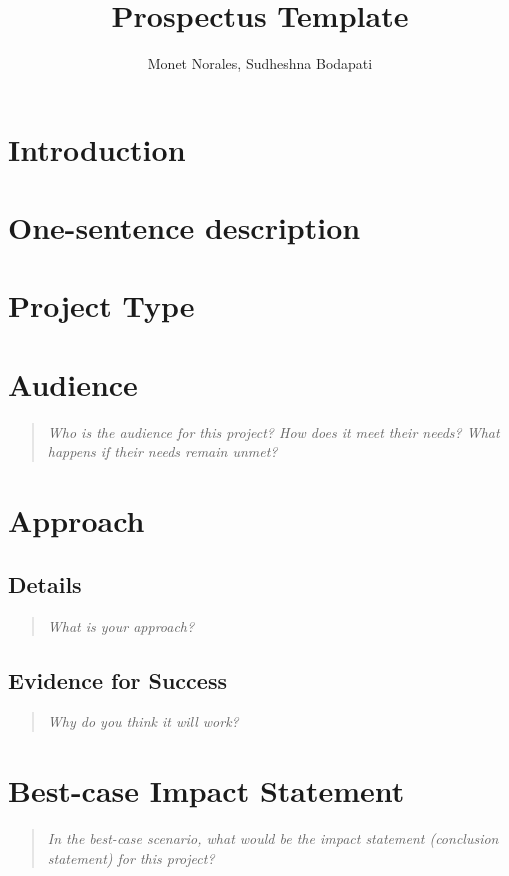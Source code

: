 \documentclass{proc}
\begin{document}
\title{Prospectus Template}

\author{Monet Norales, Sudheshna Bodapati}

\maketitle

\section{Introduction}

\section{One-sentence description}

\section{Project Type}

\section{Audience} 
\begin{quote}
\textit{Who is the audience for this project? 
How does it meet their needs? 
What happens if their needs remain unmet?}
\end{quote}

\section{Approach}
\subsection{Details}
\begin{quote}
\textit{What is your approach?}
\end{quote}

\subsection{Evidence for Success}
\begin{quote}
\textit{Why do you think it will work?} 
\end{quote}


\section{Best-case Impact Statement}
\begin{quote}
\textit{In the best-case scenario, what would be the impact statement (conclusion statement) for this project? \cite{wijk2005value, pike2009science}}
\end{quote}
\end{document}
